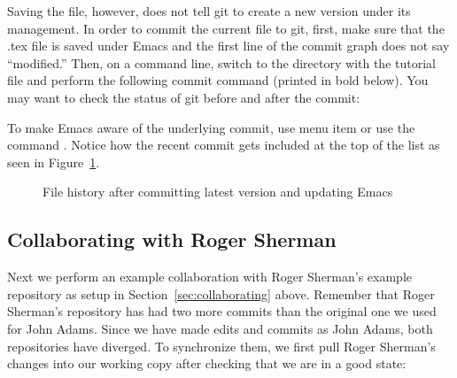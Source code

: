 Saving the file, however, does not tell git to create a new version under its management.  In order to commit the current file to git, first, make sure that the .tex file is saved under Emacs and the first line of the commit graph does not say ``modified.'' Then, on a command line, switch to the directory with the tutorial file and perform the following commit command (printed in bold below).  You may want to check the status of git before and after the commit:

To make Emacs aware of the underlying commit, use menu item  or use the command .  Notice how the recent commit gets included at the top of the list as seen in Figure~\ref{fig:emacs-new-commit}.

\begin{figure}
\centering
{}
\caption{File history after committing latest version and updating Emacs} \label{fig:emacs-new-commit}
\end{figure}

\subsection{Collaborating with Roger Sherman} \label{sec:tutorial-git-emacs:collab}

Next we perform an example collaboration with Roger Sherman's example repository as setup in Section~\ref{sec:collaborating} above.  Remember that Roger Sherman's repository has had two more commits than the original one we used for John Adams.  Since we have made edits and commits as John Adams, both repositories have diverged.  To synchronize them, we first pull Roger Sherman's changes into our working copy after checking that we are in a good state:

